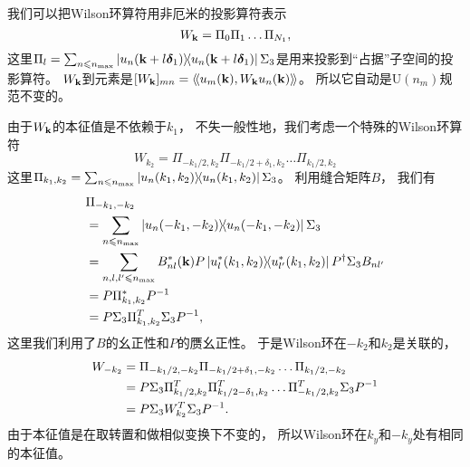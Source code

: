 我们可以把Wilson环算符用非厄米的投影算符表示
\begin{equation}
	W_{\vb k}=\Pi_0 \Pi_1 \dots \Pi_{N_1},\nonumber
\end{equation}
这里$\Pi_l=\sum_{n\leqslant n_{\textnormal{max}}} \ketbra{u_n(\vb k+l\boldsymbol{\delta}_1)}{u_n(\vb k+l\boldsymbol{\delta}_1)}\Sigma_3$是用来投影到“占据”子空间的投影算符。
$W_{\vb k}$到元素是$[W_{\vb k}]_{mn}=\langle\!\langle u_m(\vb k),W_{\vb k}u_n(\vb k) \rangle\!\rangle$。
所以它自动是$\mathrm{U}(n_m)$规范不变的。

由于$W_{\vb k}$的本征值是不依赖于$k_1$，
不失一般性地，我们考虑一个特殊的Wilson环算符
\begin{equation}
	W_{k_2}=\Pi_{-k_1/2,k_2}\Pi_{-k_1/2+\delta_1,k_2} \dots \Pi_{k_1/2,k_2}\nonumber
\end{equation}
这里$\Pi_{k_1,k_2}=\sum_{n\leqslant n_{\textnormal{max}}} \ketbra{u_n(k_1,k_2)}{u_n(k_1,k_2)}\Sigma_3$。
利用缝合矩阵$B$，
我们有
\begin{align}
	&\Pi_{-k_1,-k_2}\nonumber\\
	&=\sum_{n\leqslant n_{\textnormal{max}}} \ketbra{u_n(-k_1,-k_2)}{u_n(-k_1,-k_2)}\Sigma_3\nonumber\\
	&=\sum_{n,l,l'\leqslant n_{\textnormal{max}}}B^*_{nl}(\vb k) P \ketbra{u^*_l(k_1,k_2)}{u^*_{l'}(k_1,k_2)}P^\dagger \Sigma_3 B_{nl'}\nonumber\\
	&=P \Pi_{k_1,k_2}^* P^{-1} \label{kminusk} \\
	&= P\Sigma_3 \Pi_{k_1,k_2}^T \Sigma_3 P^{-1},\nonumber
\end{align}
这里我们利用了$B$的幺正性和$P$的赝幺正性。
于是Wilson环在$-k_2$和$k_2$是关联的，
\begin{equation}\label{WLiden}
\begin{split}
	W_{-k_2} &=\Pi_{-k_1/2,-k_2}\Pi_{-k_1/2+\delta_1,-k_2} \dots \Pi_{k_1/2,-k_2}\\
	&= P \Sigma_3 \Pi_{k_1/2,k_2}^T \Pi_{k_1/2-\delta_1,k_2}^T \dots \Pi_{-k_1/2,k_2}^T \Sigma_3 P^{-1}\\
	&= P \Sigma_3 W_{k_2}^T \Sigma_3 P^{-1} .
\end{split}
\end{equation}
由于本征值是在取转置和做相似变换下不变的，
所以Wilson环在$k_y$和$-k_y$处有相同的本征值。

